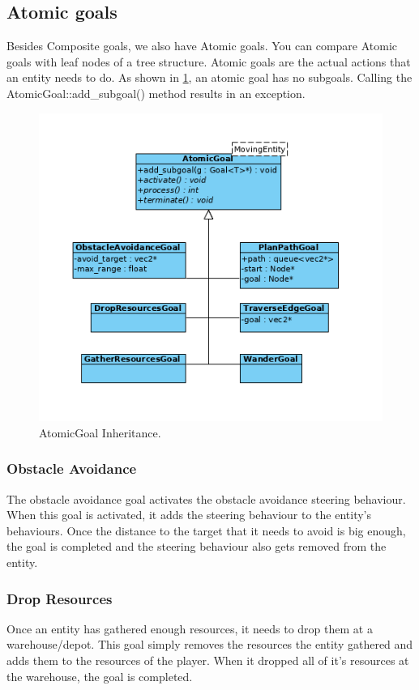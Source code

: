 \subsection{Atomic goals}
Besides Composite goals, we also have Atomic goals. You can compare Atomic 
goals with leaf nodes of a tree structure. Atomic goals are the actual actions
 that an entity needs to do. As shown in \cref{fig:atomicgoal-inherit}, an atomic 
 goal has no subgoals. Calling the AtomicGoal::add\_subgoal() method results in an 
 exception.
 
 \begin{figure}[H]
    \centering
     \includegraphics[scale=0.75]{res/AtomicGoal-Inherit.jpg}
    \caption{AtomicGoal Inheritance.}\label{fig:atomicgoal-inherit}
\end{figure}

\subsubsection{Obstacle Avoidance}
The obstacle avoidance goal activates the obstacle avoidance steering 
behaviour. When this goal is activated, it adds the steering behaviour to the 
entity's behaviours. Once the distance to the target that it needs to avoid 
is big enough, the goal is completed and the steering behaviour also gets 
removed from the entity.

\subsubsection{Drop Resources}
\label{sec:dropresources}
Once an entity has gathered enough resources, it needs to drop them at a 
warehouse/depot. This goal simply removes the resources the entity gathered and adds them to the resources of the player. When it dropped all of it's resources at the warehouse, the goal is completed.

